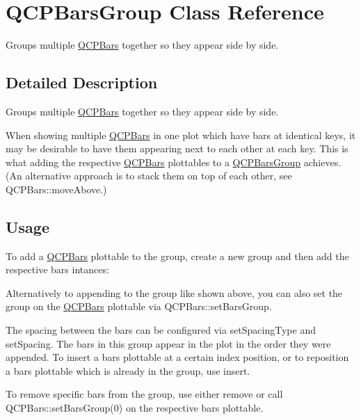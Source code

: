 \hypertarget{class_q_c_p_bars_group}{}\section{Q\+C\+P\+Bars\+Group Class Reference}
\label{class_q_c_p_bars_group}


Groups multiple \mbox{\hyperlink{class_q_c_p_bars}{Q\+C\+P\+Bars}} together so they appear side by side.  




\subsection{Detailed Description}
Groups multiple \mbox{\hyperlink{class_q_c_p_bars}{Q\+C\+P\+Bars}} together so they appear side by side. 



When showing multiple \mbox{\hyperlink{class_q_c_p_bars}{Q\+C\+P\+Bars}} in one plot which have bars at identical keys, it may be desirable to have them appearing next to each other at each key. This is what adding the respective \mbox{\hyperlink{class_q_c_p_bars}{Q\+C\+P\+Bars}} plottables to a \mbox{\hyperlink{class_q_c_p_bars_group}{Q\+C\+P\+Bars\+Group}} achieves. (An alternative approach is to stack them on top of each other, see Q\+C\+P\+Bars\+::move\+Above.)\hypertarget{class_q_c_p_bars_group_qcpbarsgroup-usage}{}\subsection{Usage}\label{class_q_c_p_bars_group_qcpbarsgroup-usage}
To add a \mbox{\hyperlink{class_q_c_p_bars}{Q\+C\+P\+Bars}} plottable to the group, create a new group and then add the respective bars intances\+: 
\begin{DoxyCodeInclude}
\end{DoxyCodeInclude}
Alternatively to appending to the group like shown above, you can also set the group on the \mbox{\hyperlink{class_q_c_p_bars}{Q\+C\+P\+Bars}} plottable via Q\+C\+P\+Bars\+::set\+Bars\+Group.

The spacing between the bars can be configured via set\+Spacing\+Type and set\+Spacing. The bars in this group appear in the plot in the order they were appended. To insert a bars plottable at a certain index position, or to reposition a bars plottable which is already in the group, use insert.

To remove specific bars from the group, use either remove or call Q\+C\+P\+Bars\+:\+:set\+Bars\+Group(0) on the respective bars plottable.

